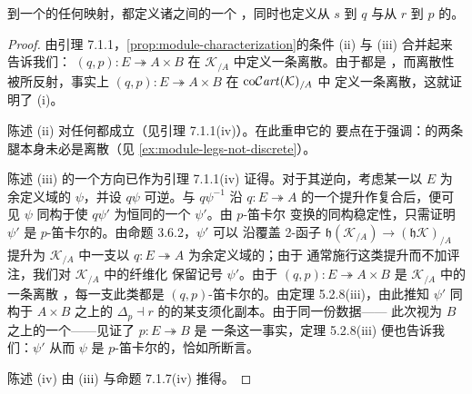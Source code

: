 \begin{lemma}
\begin{enumerate}[label=(\roman*)]
\begin{center}
\end{center}
到一个\trModule{}的任何\trSpan{}映射，都定义诸\trTwoSidedFibration{}之间的一个%
\trCartesianFunctor{}，同时也定义从 $s$ 到 $q$ 与从 $r$ 到 $p$ 的\trCartesianFunctor{}。
\end{enumerate}
\end{lemma}

\begin{proof}
由引理 7.1.1，\cref{prop:module-characterization}的条件 (ii) 与 (iii) 合并起来
告诉我们：\trTwoSidedIsofibration{} $(q,p)\colon E\twoheadrightarrow A\times B$ 在
$\mathcal{K}_{/A}$ 中定义一条离散\trCartesianFibration{}。由于\trModule{}都是%
\trTwoSidedFibration{}，而离散性被\trCosmologicalEmbedding{}所反射，事实上
$(q,p)\colon E\twoheadrightarrow A\times B$ 在 $\mathrm{co}\mathcal{C}\mathit{art}(\mathcal{K})_{/A}$ 中
定义一条离散\trCartesianFibration{}，这就证明了 (i)。

陈述 (ii) 对任何\trTwoSidedFibration{}都成立（见引理 7.1.1(iv)）。在此重申它的
要点在于强调：\trModule{}的两条腿本身未必是离散\trFibration{}（见%
\cref{ex:module-legs-not-discrete}）。

陈述 (iii) 的一个方向已作为引理 7.1.1(iv) 证得。对于其逆向，考虑某一以 $E$ 为
余定义域的\trNaturalTransformation{} $\psi$，并设 $q\psi$ 可逆。与 $q\psi^{-1}$
沿\trIsofibration{} $q\colon E\twoheadrightarrow A$ 的一个提升作复合后，便可见 $\psi$
同构于使 $q\psi'$ 为恒同的一个\trNaturalTransformation{} $\psi'$。由 $p$-笛卡尔
变换的同构稳定性，只需证明 $\psi'$ 是 $p$-笛卡尔的。由命题 3.6.2，$\psi'$ 可以
沿覆盖 2-函子 $\mathfrak{h}(\mathcal{K}_{/A})\to(\mathfrak{h}\mathcal{K})_{/A}$
提升为\trSliceInfinityCosmos{} $\mathcal{K}_{/A}$ 中一支以
$q\colon E\twoheadrightarrow A$ 为余定义域的\trNaturalTransformation{}；由于
通常施行这类提升而不加评注，我们对 $\mathcal{K}_{/A}$ 中的纤维化%
\trNaturalTransformation{}保留记号 $\psi'$。由于
$(q,p)\colon E\twoheadrightarrow A\times B$ 是 $\mathcal{K}_{/A}$ 中的一条离散%
\trCartesianFibration{}，每一支此类\trNaturalTransformation{}都是
$(q,p)$-笛卡尔的。由定理 5.2.8(iii)，由此推知 $\psi'$ 同构于 $A\times B$ 之上的%
\trFiberedAdjunction{} $\Delta_{p}\dashv r$ 的\trCounit{}的某支须化副本。由于同一份数据——
此次视为 $B$ 之上的一个\trFiberedAdjunction——见证了 $p\colon E\twoheadrightarrow B$ 是
一条\trCartesianFibration{}这一事实，定理 5.2.8(iii) 便也告诉我们：$\psi'$
从而 $\psi$ 是 $p$-笛卡尔的，恰如所断言。

陈述 (iv) 由 (iii) 与命题 7.1.7(iv) 推得。
\end{proof}

